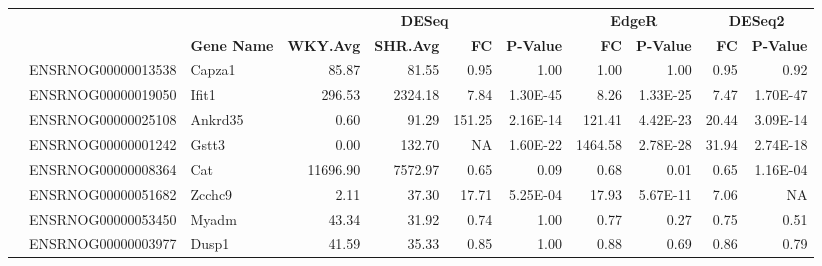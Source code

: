 \begin{sidewaystable}[]
\scriptsize
\centering
\begin{tabular}{lllrrrrrrrr}
&                   &                   & \multicolumn{4}{c}{\textbf{DESeq}}                                             & \multicolumn{2}{c}{\textbf{EdgeR}} & \multicolumn{2}{c}{\textbf{DESeq2}} \\
&                   & \textbf{Gene Name} & \textbf{WKY.Avg} & \textbf{SHR.Avg} & \textbf{FC} & \textbf{P-Value} & \textbf{FC}   & \textbf{P-Value}   & \textbf{FC}    & \textbf{P-Value}   \\
\hline
\parbox[t]{2mm}{} & ENSRNOG00000013538 & Capza1            & 85.87                 & 81.55                 & 0.95        & 1.00             & 1.00          & 1.00               & 0.95           & 0.92               \\
& ENSRNOG00000019050 & Ifit1             & 296.53                & 2324.18               & 7.84        & 1.30E-45         & 8.26          & 1.33E-25           & 7.47           & 1.70E-47           \\
& ENSRNOG00000025108 & Ankrd35           & 0.60                  & 91.29                 & 151.25      & 2.16E-14         & 121.41        & 4.42E-23           & 20.44          & 3.09E-14           \\
& ENSRNOG00000001242 & Gstt3             & 0.00                  & 132.70                & NA          & 1.60E-22         & 1464.58       & 2.78E-28           & 31.94          & 2.74E-18           \\
& ENSRNOG00000008364 & Cat               & 11696.90              & 7572.97               & 0.65        & 0.09             & 0.68          & 0.01               & 0.65           & 1.16E-04           \\
& ENSRNOG00000051682 & Zcchc9            & 2.11                  & 37.30                 & 17.71       & 5.25E-04         & 17.93         & 5.67E-11           & 7.06           & NA                 \\
\hline
\parbox[t]{2mm}{} & ENSRNOG00000053450 & Myadm             & 43.34                 & 31.92                 & 0.74        & 1.00             & 0.77          & 0.27               & 0.75           & 0.51               \\
& ENSRNOG00000003977 & Dusp1             & 41.59                 & 35.33                 & 0.85        & 1.00             & 0.88          & 0.69               & 0.86           & 0.79               \\

\end{tabular}
\end{sidewaystable}
